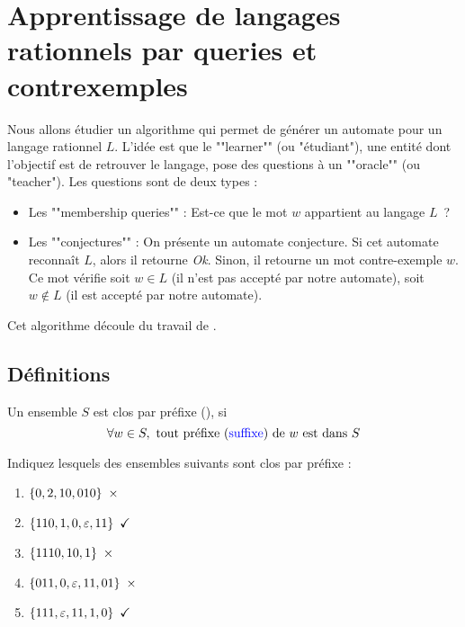 \section{Apprentissage de langages rationnels par queries et contrexemples}

Nous allons étudier un algorithme qui permet de générer un automate pour un langage rationnel $L$.
L'idée est que le ""learner"" (ou "étudiant"), une entité dont l'objectif est de retrouver le langage, pose des
questions à un ""oracle"" (ou "teacher"). Les questions sont de deux types :

\begin{itemize}
	\item Les ""membership queries"" : Est-ce que le mot $w$  appartient au langage $L$ ?
	\item Les ""conjectures"" : On présente un automate conjecture. Si cet automate reconnaît $L$, alors il retourne \emph{Ok}.
	      Sinon, il retourne un mot contre-exemple $w$. Ce mot vérifie soit $w \in L$ (il n’est pas accepté par notre
	      automate), soit $w \notin L$ (il est accepté par notre automate).
\end{itemize}

Cet algorithme découle du travail de \cite{angluinLearning}.


\subsection{Définitions}


\begin{definition}
	Un ensemble $S$ est clos par préfixe (), si
	$$\forall w \in S, \text{ tout préfixe (\textcolor{blue}{suffixe}) de $w$ est dans } S$$
\end{definition}

\begin{exercice}
	Indiquez lesquels des ensembles suivants sont clos par préfixe :
	\begin{enumerate}
		\item $\set{0,2,10,010} \ \times$
		\item $\set{110,1,0,\motvide,11} \ \checkmark$
		\item $\set{1110,10,1} \ \times$
		\item $\set{011,0,\motvide,11,01} \ \times$
		\item $\set{111,\motvide,11,1,0} \ \checkmark$
	\end{enumerate}
\end{exercice}

